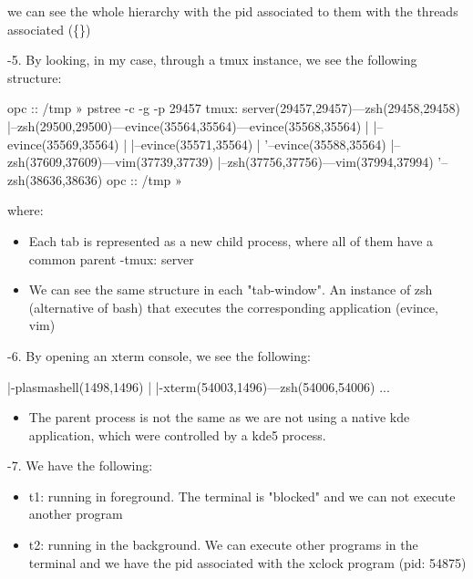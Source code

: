 \documentclass[a4paper]{article}
\begin{document}
we can see the whole hierarchy with the pid associated to them with the threads associated (\{\})

{-\allowbreak}5. By looking, in my case, through a tmux instance, we see the following structure:

\begin{plain}
opc :: /tmp » pstree -c -g -p 29457        
tmux: server(29457,29457)---zsh(29458,29458)
                          |--zsh(29500,29500)---evince(35564,35564)---{evince}(35568,35564)
                          |                                        |--{evince}(35569,35564)
                          |                                        |--{evince}(35571,35564)
                          |                                        '--{evince}(35588,35564)
                          |--zsh(37609,37609)---vim(37739,37739)
                          |--zsh(37756,37756)---vim(37994,37994)
                          '--zsh(38636,38636)
opc :: /tmp » 
\end{plain}

where:

\begin{itemize}
\item 
Each tab is represented as a new child process, where all of them have a common parent {-\allowbreak}tmux: server
\item 
We can see the same structure in each "tab{-\allowbreak}window". An instance of zsh (alternative of bash) that executes the corresponding application (evince, vim)
\end{itemize}

{-\allowbreak}6. By opening an xterm console, we see the following:

\begin{plain}
|-plasmashell(1498,1496)
|                        |-xterm(54003,1496)---zsh(54006,54006) ...

\end{plain}

\begin{itemize}
\item 
The parent process is not the same as we are not using a native kde application, which were controlled by a kde5 process.
\end{itemize}

{-\allowbreak}7.  We have the following:

\begin{itemize}
\item 
t1: running in foreground. The terminal is "blocked" and we can not execute another program
\item 
t2: running in the background. We can execute other programs in the terminal and we have the pid associated with the xclock program (pid: 54875)
\end{itemize}
\end{document}
